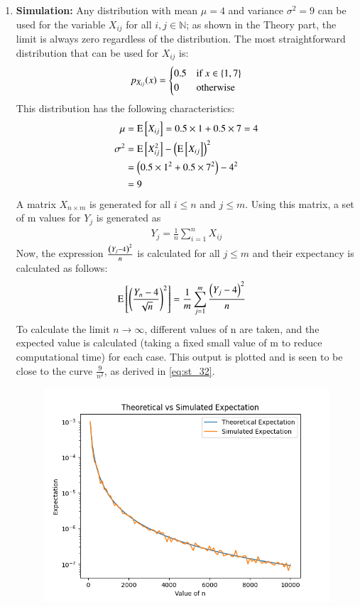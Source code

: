 \documentclass[journal,12pt,twocolumn]{IEEEtran}
\theoremstyle{remark}
\begin{document}
\begin{enumerate}
\item \textbf{Simulation:}
Any distribution with mean $\mu = 4$ and variance $\sigma^2 = 9$ can be used for the variable $X_{ij}$ for all $i,j \in \mathbb{N}$; as shown in the Theory part, the limit is always zero regardless of the distribution. The most straightforward distribution that can be used for $X_{ij}$ is:
\begin{align}
    p_{X_{ij}}(x) = \begin{cases}
    0.5 &\text{if }x \in \left\{1, 7\right\}\\
    0 &\text{otherwise }
    \end{cases}
\end{align}
This distribution has the following characteristics:
\begin{align}
    \mu &= \text{E}{}\left[X_{ij}\right] = 0.5\times1 + 0.5\times 7 = 4\\
    \sigma^2 &= \text{E}{}\left[X_{ij}^2\right] - \left(\text{E}{}\left[X_{ij}\right]\right)^2\\
    &= \left(0.5 \times 1^2 + 0.5 \times 7^2\right) - 4^2\\
    &= 9
\end{align}
A matrix $X_{n \times m}$ is generated for all $i \leq n$ and $j \leq m$.
Using this matrix, a set of m values for $Y_j$ is generated as
\begin{align}
    Y_j = \frac{1}{n} \sum_{i = 1}^{n} X_{ij}
\end{align}
Now, the expression $\frac{\left(Y_j - 4\right)^2}{n}$ is calculated for all $j \leq m$ and their expectancy is calculated as follows:
\begin{align}
    \text{E}{}\left[\left(\frac{Y_n - 4}{\sqrt{n}}\right)^2\right] &= \frac{1}{m}\sum_{j=1}^{m} \frac{\left(Y_j - 4\right)^2}{n}
\end{align}
To calculate the limit $n \rightarrow \infty$, different values of n are taken, and the expected value is calculated (taking a fixed small value of m to reduce computational time) for each case. This output is plotted and is seen to be close to the curve $\frac{9}{n^2}$, as derived in \eqref{eq:st_32}. 
\begin{figure}[h!]
    \includegraphics[width=\columnwidth]{figures/expectation.png}

\end{figure}
\end{enumerate}
\end{document}
